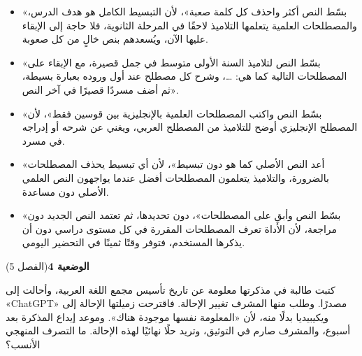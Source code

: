 \documentclass[11pt,a4paper]{article}
\begin{document}
\begin{itemize}[leftmargin=1.0cm, labelsep=6pt, itemsep=3pt, topsep=4pt, parsep=0pt]
  \item[\textbf{أ)}] «بسّط النص أكثر واحذف كل كلمة صعبة»، لأن التبسيط الكامل هو هدف الدرس، والمصطلحات العلمية يتعلمها التلاميذ لاحقًا في المرحلة الثانوية، فلا حاجة إلى الإبقاء عليها الآن، ويُسعدهم بنص خالٍ من كل صعوبة.
  \item[\textbf{ب)}] «بسّط النص لتلاميذ السنة الأولى متوسط في جمل قصيرة، مع الإبقاء على المصطلحات التالية كما هي: …، وشرح كل مصطلح عند أول وروده بعبارة بسيطة، ثم أضف مسردًا قصيرًا في آخر النص».
  \item[\textbf{ج)}] «بسّط النص واكتب المصطلحات العلمية بالإنجليزية بين قوسين فقط»، لأن المصطلح الإنجليزي أوضح للتلاميذ من المصطلح العربي، ويغني عن شرحه أو إدراجه في مسرد.
  \item[\textbf{د)}] «أعد النص الأصلي كما هو دون تبسيط»، لأن أي تبسيط يحذف المصطلحات بالضرورة، والتلاميذ يتعلمون المصطلحات أفضل عندما يواجهون النص العلمي الأصلي دون مساعدة.
  \item[\textbf{هـ)}] «بسّط النص وأبقِ على المصطلحات»، دون تحديدها، ثم تعتمد النص الجديد دون مراجعة، لأن الأداة تعرف المصطلحات المقررة في كل مستوى دراسي دون أن يذكرها المستخدم، فتوفر وقتًا ثمينًا في التحضير اليومي.
\end{itemize}
\par\vspace{6pt}
\noindent
{\large\khatt\textbf{الوضعية 4}}\hfill{\small(الفصل 5)}\par\nopagebreak\vspace{3pt}
\setlength{\fboxsep}{7pt}\colorbox{gray!10}{\parbox{\dimexpr\linewidth-14pt}{كتبت طالبة في مذكرتها معلومة عن تاريخ تأسيس مجمع اللغة العربية، وأحالت إلى «\textenglish{ChatGPT}» مصدرًا. وطلب منها المشرف تغيير الإحالة. فاقترحت زميلتها الإحالة إلى ويكيبيديا بدلًا منه، لأن «المعلومة نفسها موجودة هناك». وموعد إيداع المذكرة بعد أسبوع، والمشرف صارم في التوثيق، وتريد حلًا نهائيًا لهذه الإحالة. ما التصرف المنهجي الأنسب؟}}\par\nopagebreak
\end{document}
